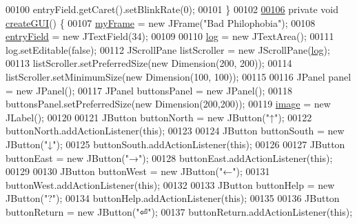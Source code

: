 \begin{DoxyCode}
00100             entryField.getCaret().setBlinkRate(0);
00101     \}
00102 
\hypertarget{UserInterface_8java_source_l00106}{}\hyperlink{classUserInterface_a5aa4ca5e24c9fce93ef91e5a6d0abd60}{00106}     \textcolor{keyword}{private} \textcolor{keywordtype}{void} \hyperlink{classUserInterface_a5aa4ca5e24c9fce93ef91e5a6d0abd60}{createGUI}() \{
00107         \hyperlink{classUserInterface_a1bb844238b260f6d4ae1852b6b1e0b97}{myFrame} = \textcolor{keyword}{new} JFrame(\textcolor{stringliteral}{"Bad Philophobia"});
00108         \hyperlink{classUserInterface_a940367d996e9e7ad6e1fa1abfe35128b}{entryField} = \textcolor{keyword}{new} JTextField(34);
00109 
00110         \hyperlink{classUserInterface_a7f6ed10812f99e2cc6ce5f497d8ba2a0}{log} = \textcolor{keyword}{new} JTextArea();
00111         log.setEditable(\textcolor{keyword}{false});
00112         JScrollPane listScroller = \textcolor{keyword}{new} JScrollPane(\hyperlink{classUserInterface_a7f6ed10812f99e2cc6ce5f497d8ba2a0}{log});
00113         listScroller.setPreferredSize(\textcolor{keyword}{new} Dimension(200, 200));
00114         listScroller.setMinimumSize(\textcolor{keyword}{new} Dimension(100, 100));
00115 
00116         JPanel panel = \textcolor{keyword}{new} JPanel();
00117         JPanel buttonsPanel = \textcolor{keyword}{new} JPanel();
00118         buttonsPanel.setPreferredSize(\textcolor{keyword}{new} Dimension(200,200));
00119         \hyperlink{classUserInterface_a0d115eb19b54f3e002ec6aa0fcfb1db4}{image} = \textcolor{keyword}{new} JLabel();
00120 
00121         JButton buttonNorth = \textcolor{keyword}{new} JButton(\textcolor{stringliteral}{"↑"});
00122         buttonNorth.addActionListener(\textcolor{keyword}{this});
00123 
00124         JButton buttonSouth = \textcolor{keyword}{new} JButton(\textcolor{stringliteral}{"↓"});
00125         buttonSouth.addActionListener(\textcolor{keyword}{this});
00126 
00127         JButton buttonEast = \textcolor{keyword}{new} JButton(\textcolor{stringliteral}{"→"});
00128         buttonEast.addActionListener(\textcolor{keyword}{this});
00129 
00130         JButton buttonWest = \textcolor{keyword}{new} JButton(\textcolor{stringliteral}{"←"});
00131         buttonWest.addActionListener(\textcolor{keyword}{this});
00132 
00133         JButton buttonHelp = \textcolor{keyword}{new} JButton(\textcolor{stringliteral}{"?"});
00134         buttonHelp.addActionListener(\textcolor{keyword}{this});
00135 
00136         JButton buttonReturn = \textcolor{keyword}{new} JButton(\textcolor{stringliteral}{"⏎"});
00137         buttonReturn.addActionListener(\textcolor{keyword}{this});

\end{DoxyCode}
